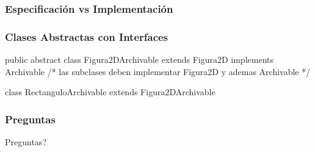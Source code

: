 \documentclass{beamer}
\begin{document}
\begin{frame}
  \frametitle{Especificación vs Implementación}
  
\end{frame}

\begin{frame}[fragile]
  \frametitle{Clases Abstractas con Interfaces}

  \begin{jsmall}
    public abstract class
    Figura2DArchivable extends Figura2D implements Archivable {
      /* las subclases deben implementar Figura2D y ademas Archivable */
    }

    class RectanguloArchivable extends Figura2DArchivable {
      

    }
  \end{jsmall}
  
\end{frame}


%

\begin{frame}
  \frametitle{Preguntas}
  \hspace{4cm}\huge{Preguntas?}  
\end{frame}
\end{document}
